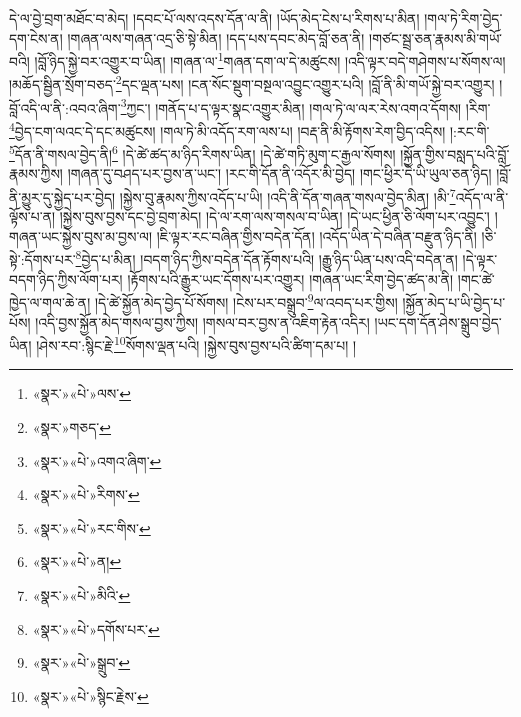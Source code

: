 དེ་ལ་བྱེ་བྲག་མཐོང་བ་མེད། །དབང་པོ་ལས་འདས་དོན་ལ་ནི། །ཡོད་མེད་ངེས་པ་རིགས་པ་མིན། །གལ་ཏེ་རིག་བྱེད་དག་ངེས་ན། །གཞན་ལས་གཞན་འདྲ་ཅི་སྟེ་མིན། །དད་པས་དབང་མེད་བློ་ཅན་ནི། །གཙང་སྦྲ་ཅན་རྣམས་མི་གཡོ་བའི། །བློ་ཉིད་སྐྱེ་བར་འགྱུར་བ་ཡིན། །གཞན་ལ་\footnote{«སྣར་»«པེ་»ལས་}གཞན་དག་ལ་དེ་མཚུངས། །འདི་ལྟར་བདེ་གཤེགས་པ་སོགས་ལ། །མཆོད་སྦྱིན་སྲོག་བཅད་\footnote{«སྣར་»གཅད་}དང་ལྡན་པས། །ངན་སོང་སྡུག་བསྔལ་འབྱུང་འགྱུར་པའི། །བློ་ནི་མི་གཡོ་སྐྱེ་བར་འགྱུར། །བློ་འདི་ལ་ནི་:འབའ་ཞིག་\footnote{«སྣར་»«པེ་»འགའ་ཞིག་}ཀྱང་། །གནོད་པ་ད་ལྟར་སྣང་འགྱུར་མིན། །གལ་ཏེ་ལ་ལར་རེས་འགའ་དོགས། །རིག་\footnote{«སྣར་»«པེ་»རིགས་}བྱེད་ངག་ལའང་དེ་དང་མཚུངས། །གལ་ཏེ་མི་འདོད་རག་ལས་པ། །བརྡ་ནི་མི་རྟོགས་རེག་བྱིད་འདིས། །:རང་གི་\footnote{«སྣར་»«པེ་»རང་གིས་}དོན་ནི་གསལ་བྱེད་ནི།\footnote{«སྣར་»«པེ་»ན།} །དེ་ཚེ་ཚད་མ་ཉིད་རིགས་ཡིན། །དེ་ཚེ་གཏི་མུག་ང་རྒྱལ་སོགས། །སྐྱོན་གྱིས་བསླད་པའི་བློ་རྣམས་ཀྱིས། །གཞན་དུ་བཤད་པར་བྱས་ན་ཡང་། །རང་གི་དོན་ནི་འདོར་མི་བྱེད། །གང་ཕྱིར་དེ་ཡི་ཡུལ་ཅན་ཉིད། །བློ་ནི་མྱུར་དུ་སྐྱེད་པར་བྱེད། །སྐྱེས་བུ་རྣམས་ཀྱིས་འདོད་པ་ཡི། །འདི་ནི་དོན་གཞན་གསལ་བྱེད་མིན། །མི་\footnote{«སྣར་»«པེ་»མིའི་}འདོད་ལ་ནི་ལྟོས་པ་ན། །སྐྱེས་བུས་བྱས་དང་བྱེ་བྲག་མེད། །དེ་ལ་རག་ལས་གསལ་བ་ཡིན། །དེ་ཡང་ཕྱིན་ཅི་ལོག་པར་འབྱུང་། །གཞན་ཡང་སྐྱེས་བུས་མ་བྱས་ལ། །ཇི་ལྟར་རང་བཞིན་གྱིས་བདེན་དོན། །འདོད་ཡིན་དེ་བཞིན་བརྫུན་ཉིད་ནི། །ཅི་སྟེ་:དོགས་པར་\footnote{«སྣར་»«པེ་»དགོས་པར་}བྱེད་པ་མིན། །བདག་ཉིད་ཀྱིས་བདེན་དོན་རྟོགས་པའི། །རྒྱུ་ཉིད་ཡིན་པས་འདི་བདེན་ན། །དེ་ལྟར་བདག་ཉིད་ཀྱིས་ལོག་པར། །རྟོགས་པའི་རྒྱུར་ཡང་དོགས་པར་འགྱུར། །གཞན་ཡང་རིག་བྱེད་ཚད་མ་ནི། །གང་ཚེ་ཁྱེད་ལ་གལ་ཆེ་ན། །དེ་ཚེ་སྐྱོན་མེད་བྱེད་པོ་སོགས། །ངེས་པར་བསྒྲུབ་\footnote{«སྣར་»«པེ་»སྒྲུབ་}ལ་འབད་པར་གྱིས། །སྐྱོན་མེད་པ་ཡི་བྱེད་པ་པོས། །འདི་བྱས་སྐྱོན་མེད་གསལ་བྱས་ཀྱིས། །གསལ་བར་བྱས་ན་འཇིག་རྟེན་འདིར། །ཡང་དག་དོན་ཤེས་སྒྲུབ་བྱེད་ཡིན། །ཤེས་རབ་:སྙིང་རྗེ་\footnote{«སྣར་»«པེ་»སྙིང་རྗེས་}སོགས་ལྡན་པའི། །སྐྱེས་བུས་བྱས་པའི་ཚིག་དམ་པ། །
